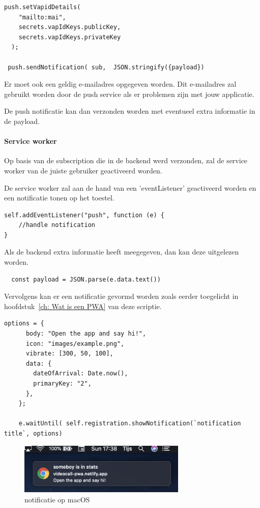 \begin{lstlisting}
push.setVapidDetails(
    "mailto:mai",
    secrets.vapIdKeys.publicKey,
    secrets.vapIdKeys.privateKey
  );
  
 push.sendNotification( sub,  JSON.stringify({payload})
\end{lstlisting}

			Er moet ook een geldig e-mailadres opgegeven worden. Dit e-mailadres zal gebruikt worden door de push service als er problemen zijn met jouw applicatie.
			
			De push notificatie kan dan verzonden worden met eventueel extra informatie in de payload.
			
		\paragraph{Service worker}
		
			Op basis van de subscription die in de backend werd verzonden, zal de service worker van de juiste gebruiker geactiveerd worden.
			
			De service worker zal aan de hand van een 'eventListener' geactiveerd worden en een notificatie tonen op het toestel.
			
			
\begin{lstlisting}
self.addEventListener("push", function (e) {
	//handle notification
}
\end{lstlisting}
			
			Als de backend extra informatie heeft meegegeven, dan kan deze uitgelezen worden.
\begin{lstlisting}
  const payload = JSON.parse(e.data.text())
\end{lstlisting}
			
			Vervolgens kan er een notificatie gevormd worden zoals eerder toegelicht in hoofdstuk~\ref{ch: Wat is een PWA} van deze scriptie.
			
\begin{lstlisting}
options = {
      body: "Open the app and say hi!",
      icon: "images/example.png",
      vibrate: [300, 50, 100],
      data: {
        dateOfArrival: Date.now(),
        primaryKey: "2",
      },
    };

    e.waitUntil( self.registration.showNotification(`notification title`, options)
\end{lstlisting}

	\begin{figure}[H]
		\centering
				\includegraphics[width=80mm]{./img/notificationMacOs}{}		
		\caption{notificatie op macOS}
	\end{figure}
			
